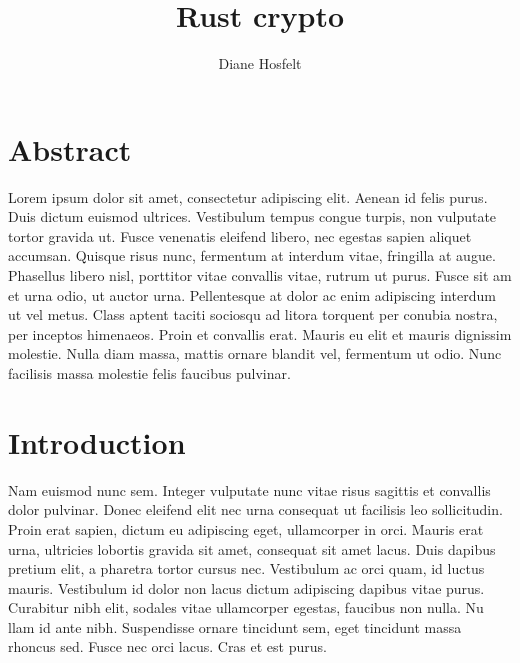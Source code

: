 \documentclass{article}
\title{Rust crypto}
\author{Diane Hosfelt}
\begin{document}

\maketitle
\begin{multicols*}{2}
\thispagestyle{fancyplain}\pagestyle{fancy}		%


\section*{Abstract}
Lorem ipsum dolor sit amet, consectetur adipiscing elit. Aenean id felis purus. Duis dictum euismod ultrices. Vestibulum tempus congue turpis, non vulputate tortor gravida ut. Fusce venenatis eleifend libero, nec egestas sapien aliquet accumsan. Quisque risus nunc, fermentum at interdum vitae, fringilla at augue. Phasellus libero nisl, porttitor vitae convallis vitae, rutrum ut purus. Fusce sit am
et urna odio, ut auctor urna. Pellentesque at dolor ac enim adipiscing interdum
ut vel metus. Class aptent taciti sociosqu ad litora torquent per conubia nostra, per inceptos himenaeos. Proin et convallis erat. Mauris eu elit et mauris dignissim molestie. Nulla diam massa, mattis ornare blandit vel, fermentum ut odio. Nunc facilisis massa molestie felis faucibus pulvinar.

\audiencesec
{}\stop

\section{Introduction}
Nam euismod nunc sem. Integer vulputate nunc vitae risus sagittis et convallis dolor pulvinar. Donec eleifend elit nec urna consequat ut facilisis leo sollicitudin. Proin erat sapien, dictum eu adipiscing eget, ullamcorper in orci. Mauris erat urna, ultricies lobortis gravida sit amet, consequat sit amet lacus. Duis dapibus pretium elit, a pharetra tortor cursus nec. Vestibulum ac orci quam, id luctus mauris. Vestibulum id dolor non lacus dictum adipiscing dapibus vitae purus. Curabitur nibh elit, sodales vitae ullamcorper egestas, faucibus non nulla. Nu
llam id ante nibh. Suspendisse ornare tincidunt sem, eget tincidunt massa rhoncus sed. Fusce nec orci lacus. Cras et est purus.


\end{multicols*}
\end{document}
